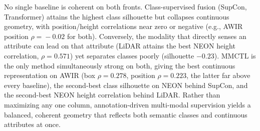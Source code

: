 \documentclass[10pt,twocolumn,letterpaper]{article}
\newcommand{\new}[1]{#1}
\begin{document}
\new{No single baseline is coherent on both fronts. Class-supervised fusion (SupCon, Transformer) attains the highest class silhouette but collapses continuous geometry, with position/height correlations near zero or negative (e.g., AWIR position $\rho\!=\!-0.02$ for both). Conversely, the modality that directly senses an attribute can lead on that attribute (LiDAR attains the best NEON height correlation, $\rho\!=\!0.571$) yet separates classes poorly (silhouette $-0.23$). MMCTL is the only method simultaneously strong on both, giving the best continuous representation on AWIR (box $\rho\!=\!0.278$, position $\rho\!=\!0.223$, the latter far above every baseline), the second-best class silhouette on NEON behind SupCon, and the second-best NEON height correlation behind LiDAR. Rather than maximizing any one column, annotation-driven multi-modal supervision yields a balanced, coherent geometry that reflects both semantic classes and continuous attributes at once.}


\newcommand{\err}[1]{\,\scriptstyle\pm\,\!#1}
\end{document}
